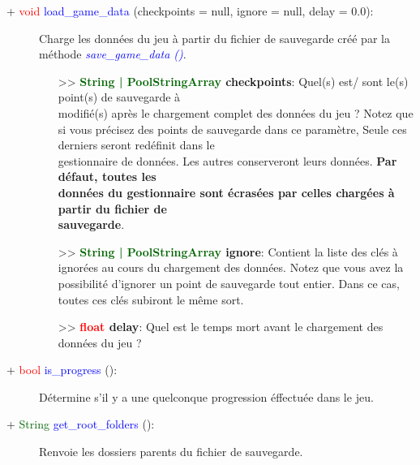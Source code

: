 \documentclass[a4paper, 11pt]{article}
\begin{document}
	\begin{description}
		\item [+ \textcolor{red}{void} \textcolor{blue}{load\_game\_data} (checkpoints = null, ignore =
		null, delay = 0.0):] Charge les données du jeu à partir du fichier de sauvegarde créé par la
		méthode \textcolor{blue}{\textit{save\_game\_data ()}}.
 		\begin{itemize}
 			\item [>> \textbf{\textcolor{darkgreen}{String | PoolStringArray} checkpoints}:] Quel(s) est/
			sont le(s) point(s) de sauvegarde à \\modifié(s) après le chargement complet des données du jeu
			? Notez que si vous précisez des points de sauvegarde dans ce paramètre, Seule ces derniers 
			seront redéfinit dans le \\gestionnaire de données. Les autres conserveront leurs données. 
			\textbf{Par défaut, toutes les \\données du gestionnaire sont écrasées par celles chargées à
			partir du fichier de \\sauvegarde}.
			\item [>> \textbf{\textcolor{darkgreen}{String | PoolStringArray} ignore}:] Contient la liste
			des clés à ignorées au cours du chargement des données. Notez que vous avez la possibilité
			d'ignorer un point de sauvegarde tout entier. Dans ce cas, toutes ces clés subiront le même
			sort.
			\item [>> \textbf{\textcolor{red}{float} delay}:] Quel est le temps mort avant le chargement des 
			données du jeu ?\\
		\end{itemize}
	\end{description}
	\begin{description}
		\item [+ \textcolor{red}{bool} \textcolor{blue}{is\_progress} ():] Détermine s'il y a une quelconque
		progression éffectuée dans le jeu.\\
	\end{description}
	\begin{description}
		\item [+ \textcolor{darkgreen}{String} \textcolor{blue}{get\_root\_folders} ():] Renvoie les
		dossiers parents du fichier de sauvegarde.\\
	\end{description}
\end{document}
